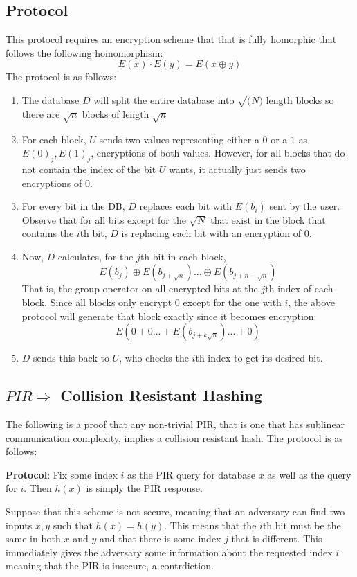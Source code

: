 \documentclass[11pt]{article}
\begin{document}
\subsection{Protocol}
This protocol requires an encryption scheme that that is fully homorphic that follows the following homomorphism:
$$E(x) \cdot E(y) = E(x \oplus y)$$
The protocol is as follows:
\begin{enumerate}
    \item The database $D$ will split the entire database into $\sqrt(N)$ length blocks so there are $\sqrt{n}$ blocks of length $\sqrt{n}$
    \item For each block, $U$ sends two values representing either a $0$ or a $1$ as $E(0)_j, E(1)_j$, encryptions of both values. However, for all blocks that do not contain the index of the bit $U$ wants, it actually just sends two encryptions of $0$.
    \item For every bit in the DB, $D$ replaces each bit with $E(b_i)$ sent by the user. Observe that for all bits except for the $\sqrt{N}$ that exist in the block that contains the $i$th bit, $D$ is replacing each bit with an encryption of $0$.
    \item Now, $D$ calculates, for the $j$th bit in each block, $$E(b_j) \oplus E(b_{j+\sqrt{n}})... \oplus E(b_{j+n-\sqrt{n}})$$ That is, the group operator on all encrypted bits at the $j$th index of each block. Since all blocks only encrypt $0$ except for the one with $i$, the above protocol will generate that block exactly since it becomes encryption:
    $$E(0 + 0 ... + E(b_{j+k\sqrt{n}})... + 0)$$
    \item $D$ sends this back to $U$, who checks the $i$th index to get its desired bit.
\end{enumerate}

\subsection{$PIR \Longrightarrow $ Collision Resistant Hashing}
The following is a proof that any non-trivial PIR, that is one that has sublinear communication complexity, implies a collision resistant hash. The protocol is as follows:
\bigskip

\textbf{Protocol}: Fix some index $i$ as the PIR query for database $x$ as well as the query for $i$. Then $h(x)$ is simply the PIR response.
\bigskip

Suppose that this scheme is not secure, meaning that an adversary can find two inputs $x,y$ such that $h(x) = h(y)$. This means that the $i$th bit must be the same in both $x$ and $y$ and that there is some index $j$ that is different. This immediately gives the adversary some information about the requested index $i$ meaning that the PIR is insecure, a contrdiction.
\end{document}
